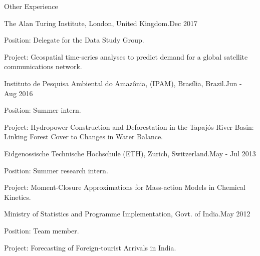 \documentclass{resume} %
\begin{document}
\begin{rSection}{Other Experience}

\begin{rSubsection}{The Alan Turing Institute, London, United Kingdom.}{Dec 2017}{}{}
\item {Position}: Delegate for the Data Study Group. 
\item {Project}: Geospatial time-series analyses to predict demand for a global satellite communications network.
\end{rSubsection}

\begin{rSubsection}{Instituto de Pesquisa Ambiental do Amaz\^ onia, (IPAM), Bras\'{i}lia, Brazil.}{{Jun - Aug 2016}}{}{}
\item {Position}: Summer intern. 
\item {Project}: Hydropower Construction and Deforestation in the Tapaj\'{o}s River Basin: Linking Forest Cover to Changes in Water Balance.
\end{rSubsection}

\begin{rSubsection}{Eidgenossische Technische Hochschule (ETH), Zurich, Switzerland.}{{May - Jul 2013}}{}{}
\item {Position}: Summer research intern. 
\item {Project}: Moment-Closure Approximations for Mass-action Models in Chemical Kinetics.
\end{rSubsection}

\begin{rSubsection}{Ministry of Statistics and Programme Implementation, Govt. of India.}{{May 2012}}{}{}
\item {Position}: Team member. 
\item {Project}: Forecasting of Foreign-tourist Arrivals in India.
\end{rSubsection}


\end{rSection}
\end{document}
